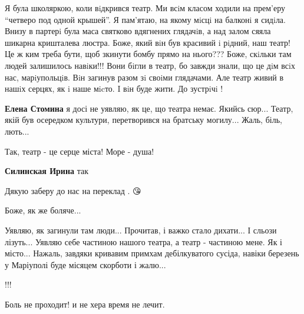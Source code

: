 
 
 
 
 

\qqSecCmt


Я була школяркою, коли вiдкрився театр. Ми всiм класом ходили на прем'еру 
\enquote{четверо под одной крышей}. Я пам'ятаю, на якому мiсцi на балконi я сидiла.
Внизу в партерi була маса святково вдягнених глядачiв, а над залом сяяла
шикарна кришталева люстра. Боже, який вiн був красивий i рiдний, наш театр! Це
ж ким треба бути, щоб зкинути бомбу прямо на нього??? Боже, скiльки там людей
залишилось навiки!!! Вони бiгли в театр, бо завжди знали, що це дiм всiх нас,
марiупольцiв. Вiн загинув разом зi своiми глядачами. Але театр живий в нашiх
серцях, як i наше мicто. I вiн буде жити. До зустрiчi !

\begin{itemize} %
\textbf{Елена Стомина} я досі не уявляю, як це, що театра немає. Якийсь сюр... Театр, якій був осередком культури, перетворився на братську могилу... Жаль, біль, лють...
\end{itemize} %


Так, театр - це серце міста! Море - душа!

\begin{itemize} %
\textbf{Силинская Ирина} так
\end{itemize} %


Дякую заберу до нас на переклад . 😘


Боже, як же боляче...


Уявляю, як загинули там люди... Прочитав, і важко стало дихати... І сльози
лізуть... Уявляю себе частиною нашого театра, а театр - частиною мене. Як і
місто... Нажаль, завдяки кривавим примхам дебілкуватого сусіда, навіки березень
у Маріуполі буде місяцем скорботи і жалю...

!!!


Боль не проходит! и не хера время не лечит.
